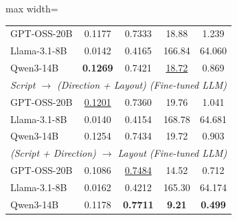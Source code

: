 \documentclass[a4j,12pt,dvipdfmx]{jsreport}
\begin{document}
\begin{table}[htbp]
\begin{adjustbox}{max width=\textwidth}
\begin{tabular}{l c c c c}
         GPT-OSS-20B
                                                           & 0.1177                                              & 0.7333             & 18.88             & 1.239             \\
         Llama-3.1-8B
                                                           & 0.0142                                              & 0.4165             & 166.84            & 64.060            \\
         Qwen3-14B
                                                           & \textbf{0.1269}                                     & 0.7421             & \underline{18.72} & 0.869             \\
         \midrule

         \multicolumn{5}{l}{\itshape Script $\rightarrow$ (Direction + Layout) (Fine-tuned LLM)}                                                                              \\

         GPT-OSS-20B
                                                           & \underline{0.1201}                                  & 0.7360             & 19.76             & 1.041             \\
         Llama-3.1-8B
                                                           & 0.0140                                              & 0.4154             & 168.78            & 64.681            \\
         Qwen3-14B
                                                           & 0.1254                                              & 0.7434             & 19.72             & 0.903             \\
         \midrule

         \multicolumn{5}{l}{\itshape (Script + Direction) $\rightarrow$ Layout (Fine-tuned LLM)}                                                                              \\

         GPT-OSS-20B
                                                           & 0.1086                                              & \underline{0.7484} & 14.52             & 0.712             \\
         Llama-3.1-8B
                                                           & 0.0162                                              & 0.4212             & 165.30            & 64.174            \\
         Qwen3-14B
                                                           & 0.1178                                              & \textbf{0.7711}    & \textbf{9.21}     & \textbf{0.499}    \\
         \midrule


\end{tabular}
\end{adjustbox}
\end{table}
\end{document}
